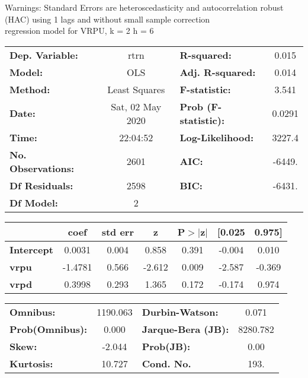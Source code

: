 Warnings: \newline
 [1] Standard Errors are heteroscedasticity and autocorrelation robust (HAC) using 1 lags and without small sample correction\\ 

regression model for VRPU, k = 2 h = 6\begin{center}
\begin{tabular}{lclc}
\toprule
\textbf{Dep. Variable:}    &       rtrn       & \textbf{  R-squared:         } &     0.015   \\
\textbf{Model:}            &       OLS        & \textbf{  Adj. R-squared:    } &     0.014   \\
\textbf{Method:}           &  Least Squares   & \textbf{  F-statistic:       } &     3.541   \\
\textbf{Date:}             & Sat, 02 May 2020 & \textbf{  Prob (F-statistic):} &   0.0291    \\
\textbf{Time:}             &     22:04:52     & \textbf{  Log-Likelihood:    } &    3227.4   \\
\textbf{No. Observations:} &        2601      & \textbf{  AIC:               } &    -6449.   \\
\textbf{Df Residuals:}     &        2598      & \textbf{  BIC:               } &    -6431.   \\
\textbf{Df Model:}         &           2      & \textbf{                     } &             \\
\bottomrule
\end{tabular}
\begin{tabular}{lcccccc}
                   & \textbf{coef} & \textbf{std err} & \textbf{z} & \textbf{P$> |$z$|$} & \textbf{[0.025} & \textbf{0.975]}  \\
\midrule
\textbf{Intercept} &       0.0031  &        0.004     &     0.858  &         0.391        &       -0.004    &        0.010     \\
\textbf{vrpu}      &      -1.4781  &        0.566     &    -2.612  &         0.009        &       -2.587    &       -0.369     \\
\textbf{vrpd}      &       0.3998  &        0.293     &     1.365  &         0.172        &       -0.174    &        0.974     \\
\bottomrule
\end{tabular}
\begin{tabular}{lclc}
\textbf{Omnibus:}       & 1190.063 & \textbf{  Durbin-Watson:     } &    0.071  \\
\textbf{Prob(Omnibus):} &   0.000  & \textbf{  Jarque-Bera (JB):  } & 8280.782  \\
\textbf{Skew:}          &  -2.044  & \textbf{  Prob(JB):          } &     0.00  \\
\textbf{Kurtosis:}      &  10.727  & \textbf{  Cond. No.          } &     193.  \\
\bottomrule
\end{tabular}
\end{center}

